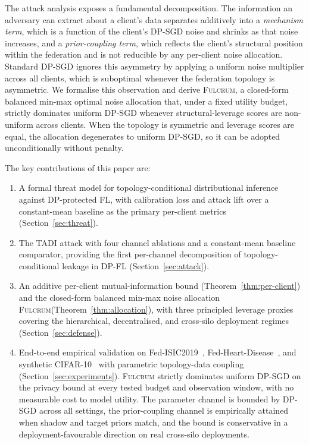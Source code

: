 \documentclass[letterpaper,journal]{IEEEtran}
\newcommand{\TADI}{\textsc{TADI}\xspace}
\newcommand{\Fulcrum}{\textsc{Fulcrum}\xspace}
\begin{document}
The attack analysis exposes a fundamental decomposition. The
information an adversary can extract about a client's data separates
additively into a \textit{mechanism term}, which is a function of the client's
DP-SGD noise and shrinks as that noise increases, and a
\textit{prior-coupling term}, which reflects the client's structural position
within the federation and is not reducible by any per-client noise
allocation. Standard DP-SGD ignores this asymmetry by applying a
uniform noise multiplier across all clients, which is suboptimal
whenever the federation topology is asymmetric. We formalise this
observation and derive \Fulcrum, a closed-form balanced min-max
optimal noise allocation that, under a fixed utility budget, strictly
dominates uniform DP-SGD whenever structural-leverage scores are
non-uniform across clients. When the topology is symmetric and
leverage scores are equal, the allocation degenerates to
uniform DP-SGD, so it can be adopted unconditionally without penalty.\medskip

\noindent The key contributions of this paper are:
\begin{enumerate}[leftmargin=*,topsep=2pt,itemsep=2pt]
\item A formal threat model for topology-conditional distributional
  inference against DP-protected FL, with calibration loss and attack
  lift over a constant-mean baseline as the primary per-client
  metrics (Section~\ref{sec:threat}).
\item The \TADI attack with four channel ablations and a constant-mean
baseline comparator, providing the first per-channel decomposition
of topology-conditional leakage in DP-FL
(Section~\ref{sec:attack}).
\item An additive per-client mutual-information bound
  (Theorem~\ref{thm:per-client}) and the closed-form balanced min-max
  noise allocation \Fulcrum (Theorem~\ref{thm:allocation}), with three
  principled leverage proxies covering the hierarchical, decentralised,
  and cross-silo deployment regimes (Section~\ref{sec:defense}).
\item End-to-end empirical validation on Fed-ISIC2019~\cite{flamby2022},
  Fed-Heart-Disease~\cite{flamby2022}, and synthetic CIFAR-10~\cite{krizhevsky2009cifar} with parametric
  topology-data coupling (Section~\ref{sec:experiments}). \Fulcrum
  strictly dominates uniform DP-SGD on the privacy bound at every
  tested budget and observation window, with no measurable cost to
  model utility. The parameter channel is bounded by DP-SGD across
  all settings, the prior-coupling channel is empirically attained
  when shadow and target priors match, and the bound is conservative
  in a deployment-favourable direction on real cross-silo deployments.
\end{enumerate}
\end{document}
